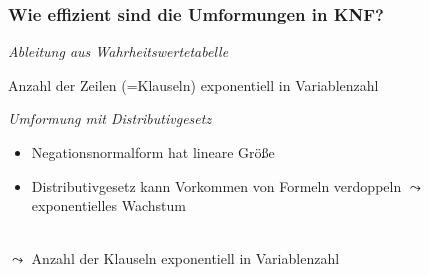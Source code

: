 \documentclass[aspectratio=1610,onlymath]{beamer}
\let\beameroriginaldoublebackslash\\
\let\\=\beameroriginaldoublebackslash
\begin{document}
\begin{frame}\frametitle{Wie effizient sind die Umformungen in KNF?}

\emph{Ableitung aus Wahrheitswertetabelle}\medskip

Anzahl der Zeilen (=Klauseln) \alert{exponentiell} in Variablenzahl
\bigskip\pause

\emph{Umformung mit Distributivgesetz}%

\begin{itemize}
\item Negationsnormalform hat lineare Größe
\item Distributivgesetz kann Vorkommen von Formeln verdoppeln $\leadsto$ exponentielles Wachstum
\end{itemize}\pause

\\[1ex]
$\leadsto$ Anzahl der Klauseln \alert{exponentiell} in Variablenzahl

\end{frame}
\end{document}
